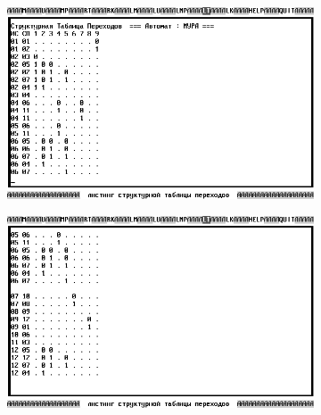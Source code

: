 \documentclass[a4paper,oneside,DIV=12,12pt,headings=normal]{scrartcl}
\begin{document}
\begin{figure}
			\begin{subfigure}[t]{0.5\linewidth-0.8em}
			\centering
				\includegraphics[width = \linewidth]{./assets/02-ris-rus_002-bw.png}
			\caption{}
			\label{subfig:ristpic-structured-jump-table-00}
			\end{subfigure}
			\quad
			\begin{subfigure}[t]{0.5\linewidth-0.8em}
			\centering
				\includegraphics[width = \linewidth]{./assets/03-ris-rus_003-bw.png}
			\caption{}
			\label{subfig:ristpic-structured-jump-table-01}
			\end{subfigure}\vspace*{\floatsep}
			

\end{figure}
\end{document}
